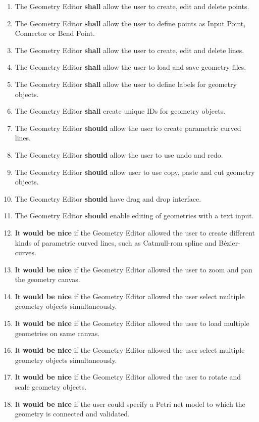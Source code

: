 \begin{enumerate}
	\item The Geometry Editor \textbf{shall} allow the user to create, edit and delete points.
	\item The Geometry Editor \textbf{shall} allow the user to define points as Input Point, Connector or Bend Point.
	\item The Geometry Editor \textbf{shall} allow the user to create, edit and delete lines.
	\item The Geometry Editor \textbf{shall} allow the user to load and save geometry files.
	\item The Geometry Editor \textbf{shall} allow the user to define labels for geometry objects.
	\item The Geometry Editor \textbf{shall} create unique IDs for geometry objects.
	\item The Geometry Editor \textbf{should} allow the user to create parametric curved lines.
	\item The Geometry Editor \textbf{should} allow the user to use undo and redo.
	\item The Geometry Editor \textbf{should} allow user to use copy, paste and cut geometry objects.
	\item The Geometry Editor \textbf{should} have drag and drop interface.
	\item The Geometry Editor \textbf{should} enable editing of geometries with a text input.
	\item It \textbf{would be nice} if the Geometry Editor allowed the user to create different kinds of parametric curved lines, such as Catmull-rom spline and Bézier-curves.
	\item It \textbf{would be nice} if the Geometry Editor allowed the user to zoom and pan the geometry canvas.
	\item It \textbf{would be nice} if the Geometry Editor allowed the user select multiple geometry objects simultaneously.
	\item It \textbf{would be nice} if the Geometry Editor allowed the user to load multiple geometries on same canvas.
	\item It \textbf{would be nice} if the Geometry Editor allowed the user select multiple geometry objects simultaneously.
	\item It \textbf{would be nice} if the Geometry Editor allowed the user to rotate and scale geometry objects.
	\item It \textbf{would be nice} if the user could specify a Petri net model to which the geometry is connected and validated.
\end{enumerate}

